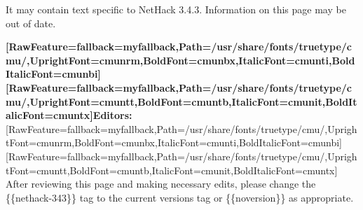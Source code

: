 It may contain text specific to NetHack 3.4.3\footnotemark[153]. Information on this page may be out of date.


{\bfseries \allowbreak{}\setmainfont{cmunbx.ttf}[RawFeature={fallback=myfallback},Path=/usr/share/fonts/truetype/cmu/,UprightFont=cmunrm,BoldFont=cmunbx,ItalicFont=cmunti,BoldItalicFont=cmunbi]\setmonofont{cmunbx.ttf}[RawFeature={fallback=myfallback},Path=/usr/share/fonts/truetype/cmu/,UprightFont=cmuntt,BoldFont=cmuntb,ItalicFont=cmunit,BoldItalicFont=cmuntx]\bfseries Editors:}{$\text{ }$}\allowbreak{}\setmainfont{cmunrm.ttf}[RawFeature={fallback=myfallback},Path=/usr/share/fonts/truetype/cmu/,UprightFont=cmunrm,BoldFont=cmunbx,ItalicFont=cmunti,BoldItalicFont=cmunbi]\setmonofont{cmunrm.ttf}[RawFeature={fallback=myfallback},Path=/usr/share/fonts/truetype/cmu/,UprightFont=cmuntt,BoldFont=cmuntb,ItalicFont=cmunit,BoldItalicFont=cmuntx] After reviewing this page and making necessary edits, please change the \{\{nethack-{}343\}\} tag to the current version\textquotesingle{}s tag or \{\{noversion\}\} as appropriate.
